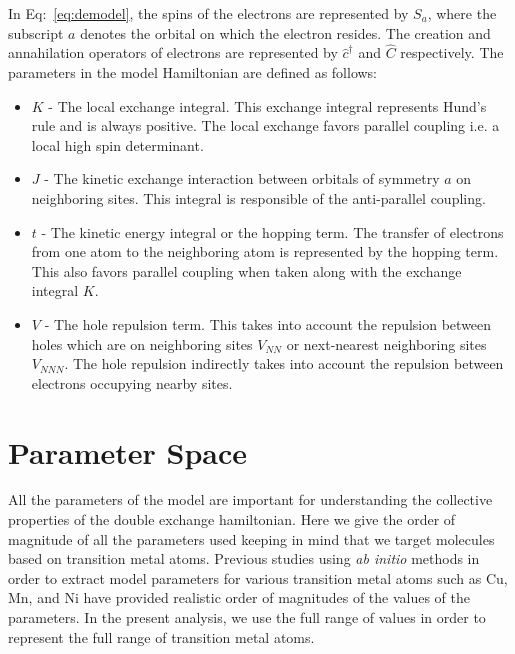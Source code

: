 \documentclass[12pt,twoside]{report}
\begin{document}
	In Eq:~\ref{eq:demodel}, the spins of the electrons are represented by $S_a$,
	where the subscript $a$ denotes the orbital on which the electron resides.  The
	creation and annahilation operators of electrons are represented by
	$\hat{c}^{\dagger}$ and $\hat{C}$ respectively. The parameters in the model
	Hamiltonian are defined as follows:
	
	\begin{itemize}
		
		\item $K$ - The local exchange integral. This exchange integral represents
		Hund's rule and is always positive. The local exchange favors parallel
		coupling i.e. a local high spin determinant.
		
		\item $J$ - The kinetic exchange interaction between orbitals of symmetry $a$
		on neighboring sites. This integral is responsible of the anti-parallel coupling.
		
		\item $t$ - The kinetic energy integral or the hopping term. The
		transfer of electrons from one atom to the neighboring atom is represented
		by the hopping term. This also favors parallel coupling when taken along with
		the exchange integral $K$.
		
		\item $V$ - The hole repulsion term. This takes into account the repulsion between
		holes which are on neighboring sites $V_{NN}$ or next-nearest neighboring sites $V_{NNN}$. The hole repulsion indirectly takes into account the repulsion between
		electrons occupying nearby sites.\cite{calzado_proposal_2001}
		
	\end{itemize}
	
	\section{Parameter Space}
	
	All the parameters of the model are important for understanding the collective
	properties of the double exchange hamiltonian. Here we give the order of magnitude
	of all the parameters used keeping in mind that we target molecules based on
	transition metal atoms.
	Previous studies using \textit{ab initio} methods in order to extract model
	parameters for various transition metal atoms such as Cu, Mn, and Ni have
	provided realistic order of magnitudes of the values of the parameters.
	In the present analysis, we use the full range of values in order to represent
	the full range of transition metal atoms.
	
\end{document}
